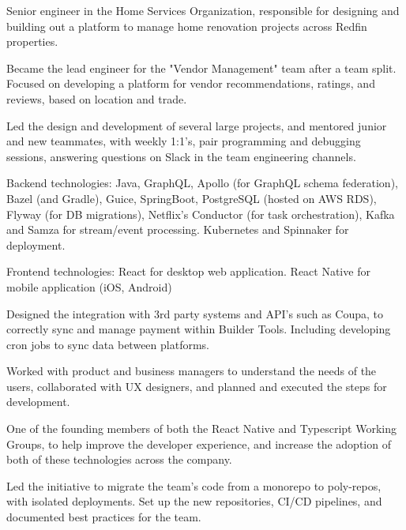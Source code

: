 \documentclass[letterpaper]{deedy-resume-openfont} %
\begin{document}
\begin{tightemize}
\item Senior engineer in the Home Services Organization, responsible for designing and building out a platform to manage home renovation projects across Redfin properties. 
\item Became the lead engineer for the "Vendor Management" team after a team split. Focused on developing a platform for vendor recommendations, ratings, and reviews, based on location and trade.
\item Led the design and development of several large projects, and mentored junior and new teammates, with weekly 1:1's, pair programming and debugging sessions, answering questions on Slack in the team engineering channels.
\item Backend technologies: Java, GraphQL, Apollo (for GraphQL schema federation), Bazel (and Gradle), Guice, SpringBoot, PostgreSQL (hosted on AWS RDS), Flyway (for DB migrations), Netflix's Conductor (for task orchestration), Kafka and Samza for stream/event processing. Kubernetes and Spinnaker for deployment. 
\item Frontend technologies: React for desktop web application. React Native for mobile application (iOS, Android)
\item Designed the integration with 3rd party systems and API's such as Coupa, to correctly sync and manage payment within Builder Tools. Including developing cron jobs to sync data between platforms.
\item Worked with product and business managers to understand the needs of the users, collaborated with UX designers, and planned and executed the steps for development.
\item One of the founding members of both the React Native and Typescript Working Groups, to help improve the developer experience, and increase the adoption of both of these technologies across the company.
\item Led the initiative to migrate the team's code from a monorepo to poly-repos, with isolated deployments. Set up the new repositories, CI/CD pipelines, and documented best practices for the team.
\end{tightemize}

\sectionsep %


\end{document}
